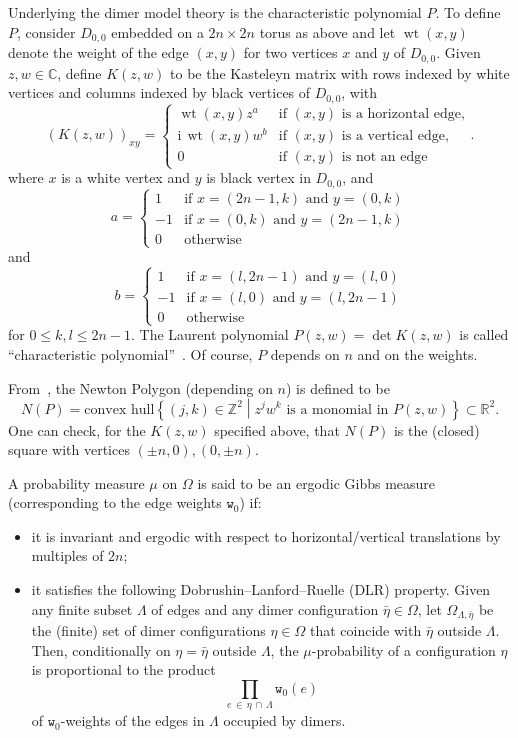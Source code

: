 \documentclass[AHL,Unicode,longabstracts,published]{cedram}
\newcommand{\ttw}{\mathtt{w}}
\newcommand{\bbZ}{\mathbb{Z}}
\newcommand{\bbC}{\mathbb{C}}
\newcommand{\bbR}{\mathbb{R}}
\newcommand{\rmi}{\mathrm{i}}
\DeclareMathOperator{\wt}{wt}
\newcommand{\ttw}{\mathtt{w}}
\begin{document}
Underlying the dimer model theory is the {characteristic polynomial} $P$. To define $P$, consider $D_{0,0}$ embedded on a $2n\times 2n$ torus as above and let $\wt(x,y)$ denote the weight of the edge $(x,y)$ for two vertices $x$ and $y$ of $D_{0,0}$. Given $z,w\in \bbC$, define $K(z,w)$ to be the Kasteleyn matrix with rows indexed by white vertices and columns indexed by black vertices of $D_{0,0}$, with
\[
(K(z,w))_{xy} =\begin{cases}
\wt(x,y)z^a & \text{if }  (x,y) \text{ is a horizontal edge,}\\
\rmi \,\wt(x,y) w^b & \text{if } (x,y) \text{ is a vertical edge,}\\
0 & \text{if }  (x,y) \text{ is not an edge}
\end{cases}.
\]
where $x$ is a white vertex and $y$ is black vertex in $D_{0,0}$, and
\[
a= 
\begin{cases}
1 & \text{if }x=(2n-1,k)\text{ and }y=(0,k)\\
-1 & \text{if }x=(0,k)\text{ and }y=(2n-1,k)\\
0 & \text{otherwise}
\end{cases}
\]
and
\[
b=
\begin{cases}
1 & \text{if }x=(l,2n-1)\text{ and }y=(l,0)\\
-1 & \text{if }x=(l,0)\text{ and }y=(l,2n-1)\\
0 & \text{otherwise}
\end{cases}
\]
for $0 \leq k,l \leq 2n-1$. The Laurent polynomial $P(z,w)=\det K(z,w)$ is called ``characteristic polynomial''~\cite{KOS03}. Of course, $P$ depends on $n$ and on the weights.

From~\cite{KOS03}, the Newton Polygon (depending on $n$) is defined to be
\[
N(P)=\text{convex hull}\left\{ (j,k) \in \bbZ^2\middle|z^j w^k \text{ is a monomial in }P(z,w) \right\}\subset \bbR^2.
\]
One can check, for the $K(z,w)$ specified above, that $N(P)$ is the (closed) square with vertices $(\pm n,0),(0,\pm n)$.


A probability measure $\mu$ on $\Omega$ is said to be an ergodic Gibbs measure (corresponding to the edge weights $\ttw_0$) if:
\begin{itemize}
\item it is invariant and ergodic with respect to horizontal/vertical translations by multiples of $2n$;
\item it satisfies the following Dobrushin--Lanford--Ruelle (DLR) property. Given any finite subset $\Lambda$ of edges and any dimer configuration $\bar \eta\in \Omega$, let $\Omega_{\Lambda,\bar \eta}$ be the (finite) set of dimer configurations $\eta\in\Omega$ that coincide with $\bar\eta$ outside $\Lambda$. Then, conditionally on $\eta=\bar \eta$ outside $\Lambda$, the $\mu$-probability of a configuration $\eta$ is proportional to the product
\[
\prod_{e\,\in\,\eta\,\cap\,\Lambda} \ttw_0(e)
\]
of $\ttw_0$-weights of the edges in $\Lambda $ occupied by dimers.
\end{itemize}
\end{document}
